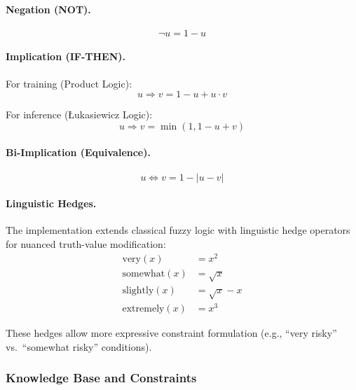 \documentclass[12pt, a4paper]{article}
\begin{document}
\paragraph{Negation (NOT).}
\begin{equation}
	\neg u = 1 - u
	\label{eq:not}
\end{equation}

\paragraph{Implication (IF-THEN).}
For training (Product Logic):
\begin{equation}
	u \Rightarrow v = 1 - u + u \cdot v
	\label{eq:implication_product}
\end{equation}

For inference (Łukasiewicz Logic):
\begin{equation}
	u \Rightarrow v = \min(1, 1 - u + v)
	\label{eq:implication_lukasiewicz}
\end{equation}

\paragraph{Bi-Implication (Equivalence).}
\begin{equation}
	u \Leftrightarrow v = 1 - |u - v|
	\label{eq:biimplication}
\end{equation}

\paragraph{Linguistic Hedges.}
The implementation extends classical fuzzy logic with linguistic hedge operators for nuanced truth-value modification:
\begin{align}
	\text{very}(x)      & = x^2          \label{eq:hedge_very} \\
	\text{somewhat}(x)  & = \sqrt{x}     \label{eq:hedge_somewhat} \\
	\text{slightly}(x)  & = \sqrt{x} - x \label{eq:hedge_slightly} \\
	\text{extremely}(x) & = x^3          \label{eq:hedge_extremely}
\end{align}

These hedges allow more expressive constraint formulation (e.g., ``very risky'' vs.\ ``somewhat risky'' conditions).

\subsubsection{Knowledge Base and Constraints}
\end{document}
